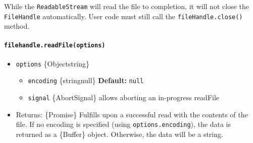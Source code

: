\begin{Shaded}
\begin{Highlighting}[]
\NormalTok{ \{}
\OperatorTok{,}
\NormalTok{\} }\OperatorTok{=} \NormalTok{(}\NormalTok{)}\OperatorTok{;}

\NormalTok{(}\NormalTok{ () }\KeywordTok{=\textgreater{}}\NormalTok{ \{}
  \OperatorTok{=}  \NormalTok{(}\NormalTok{)}\OperatorTok{;}

   \NormalTok{ (}\NormalTok{())}
    \OperatorTok{;}

  \NormalTok{()}\OperatorTok{;}
\NormalTok{\})()}\OperatorTok{;}
\end{Highlighting}
\end{Shaded}

While the \texttt{ReadableStream} will read the file to completion, it
will not close the \texttt{FileHandle} automatically. User code must
still call the \texttt{fileHandle.close()} method.

\paragraph{\texorpdfstring{\texttt{filehandle.readFile(options)}}{filehandle.readFile(options)}}\label{filehandle.readfileoptions}

\begin{itemize}
\tightlist
\item
  \texttt{options} \{Object\textbar string\}

  \begin{itemize}
  \tightlist
  \item
    \texttt{encoding} \{string\textbar null\} \textbf{Default:}
    \texttt{null}
  \item
    \texttt{signal} \{AbortSignal\} allows aborting an in-progress
    readFile
  \end{itemize}
\item
  Returns: \{Promise\} Fulfills upon a successful read with the contents
  of the file. If no encoding is specified (using
  \texttt{options.encoding}), the data is returned as a \{Buffer\}
  object. Otherwise, the data will be a string.
\end{itemize}

